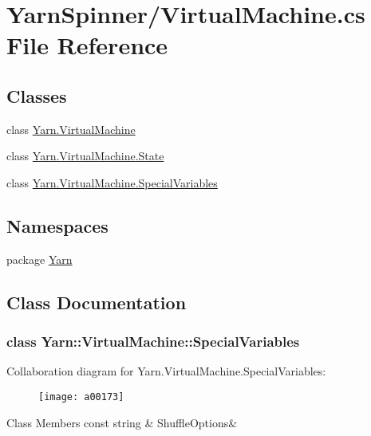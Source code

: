 \hypertarget{a00127}{\section{Yarn\-Spinner/\-Virtual\-Machine.cs File Reference}
\label{a00127}
}
\subsection*{Classes}
\begin{DoxyCompactItemize}
\item 
class \hyperlink{a00072}{Yarn.\-Virtual\-Machine}
\item 
class \hyperlink{a00075}{Yarn.\-Virtual\-Machine.\-State}
\item 
class \hyperlink{a00072_a00162}{Yarn.\-Virtual\-Machine.\-Special\-Variables}
\end{DoxyCompactItemize}
\subsection*{Namespaces}
\begin{DoxyCompactItemize}
\item 
package \hyperlink{a00026}{Yarn}
\end{DoxyCompactItemize}


\subsection{Class Documentation}
\label{a00162}
\hypertarget{a00072_a00162}{}
\subsubsection{class Yarn\-:\-:Virtual\-Machine\-:\-:Special\-Variables}


Collaboration diagram for Yarn.\-Virtual\-Machine.\-Special\-Variables\-:
\nopagebreak
\begin{figure}[H]
\begin{center}
\leavevmode
\texttt{[image: a00173]}
\end{center}
\end{figure}
\begin{DoxyFields}{Class Members}
\hypertarget{a00072_aecbb8ab9becd96457d836100b2818078}{const string}\label{a00072_aecbb8ab9becd96457d836100b2818078}
&
Shuffle\-Options&
\\
\hline

\end{DoxyFields}
